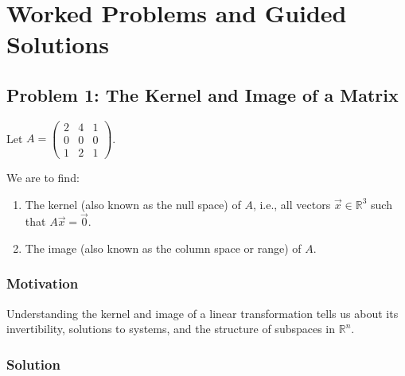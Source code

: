 \documentclass[12pt]{article}
\theoremstyle{definition}
\theoremstyle{plain}
\begin{document}
\section{Worked Problems and Guided Solutions}

\subsection{Problem 1: The Kernel and Image of a Matrix}

Let \( A = 
\begin{pmatrix}
2 & 4 & 1 \\
0 & 0 & 0 \\
1 & 2 & 1
\end{pmatrix} \).

We are to find:
\begin{enumerate}[label=(\alph*)]
    \item The kernel (also known as the null space) of \( A \), i.e., all vectors \( \vec{x} \in \mathbb{R}^3 \) such that \( A\vec{x} = \vec{0} \).
    \item The image (also known as the column space or range) of \( A \).
\end{enumerate}

\subsubsection*{Motivation}

Understanding the kernel and image of a linear transformation tells us about its invertibility, solutions to systems, and the structure of subspaces in \( \mathbb{R}^n \).

\subsubsection*{Solution}
\end{document}
